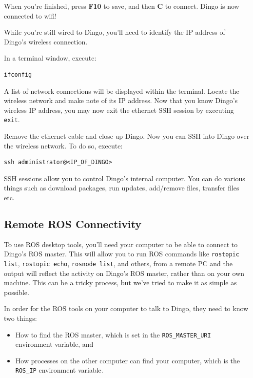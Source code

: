 \documentclass[]{clearpath-latex/clearpath-manual}
\begin{document}
When you’re finished, press \textbf{F10} to save, and then \textbf{C} to connect.  Dingo is now connected to wifi!

While you're still wired to Dingo, you'll need to identify the IP address of Dingo's wireless connection.

In a terminal window, execute:

\begin{lstlisting}
ifconfig
\end{lstlisting}

A list of network connections will be displayed within the terminal.  Locate the wireless network and make note of its IP address. Now that you know Dingo's wireless IP address, you may now exit the ethernet SSH session by executing \lstinline{exit}.

Remove the ethernet cable and close up Dingo.   Now you can SSH into Dingo over the wireless network.  To do so, execute:

\begin{lstlisting}
ssh administrator@<IP_OF_DINGO>
\end{lstlisting}

SSH sessions allow you to control Dingo's internal computer.  You can do various things such as download packages, run updates, add/remove files, transfer files etc.

\subsection{Remote ROS Connectivity}\label{remote}

To use ROS desktop tools, you’ll need your computer to be able to connect to Dingo’s ROS master. This will allow you to run ROS commands like \lstinline{rostopic list}, \lstinline{rostopic echo}, \lstinline{rosnode list}, and others, from a remote PC and the output will reflect the activity on Dingo’s ROS master, rather than on your own machine.  This can be a tricky process, but we’ve tried to make it as simple as possible.

In order for the ROS tools on your computer to talk to Dingo, they need to know two things:

\begin{itemize}[nolistsep]
  \item How to find the ROS master, which is set in the \lstinline{ROS_MASTER_URI} environment variable, and
  \item How processes on the other computer can find your computer, which is the \lstinline{ROS_IP} environment variable.
\end{itemize}
\end{document}
